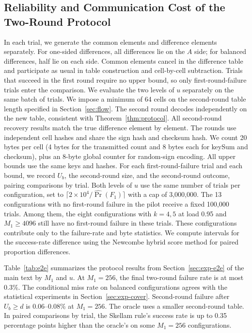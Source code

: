 \subsection{Reliability and Communication Cost of the Two-Round Protocol}\label{app:protocol}
In each trial, we generate the common elements and difference elements separately. For one-sided differences, all differences lie on the $A$ side; for balanced differences, half lie on each side. Common elements cancel in the difference table and participate as usual in table construction and cell-by-cell subtraction. Trials that succeed in the first round require no upper bound, so only first-round-failure trials enter the comparison. We evaluate the two levels of $u$ separately on the same batch of trials. We impose a minimum of 64 cells on the second-round table length specified in Section~\ref{sec:flow}. The second round decodes independently on the new table, consistent with Theorem~\ref{thm:protocol}. All second-round recovery results match the true difference element by element. The rounds use independent cell hashes and share the sign hash and checksum hash. We count 20 bytes per cell (4 bytes for the transmitted count and 8 bytes each for keySum and checksum), plus an 8-byte global counter for random-sign encoding. All upper bounds use the same keys and hashes. For each first-round-failure trial and each bound, we record $U_b$, the second-round size, and the second-round outcome, pairing comparisons by trial. Both levels of $u$ use the same number of trials per configuration, set to $\lceil2\times10^4/\widehat{\Pr}(F_1)\rceil$ with a cap of 3,000,000. The 13 configurations with no first-round failure in the pilot receive a fixed 100,000 trials. Among them, the eight configurations with $k=4,5$ at load 0.95 and $M_1\ge4096$ still have no first-round failure in these trials. These configurations contribute only to the failure-rate and byte statistics. We compute intervals for the success-rate difference using the Newcombe hybrid score method for paired proportion differences.

Table~\ref{tab:e2e} summarizes the protocol results from Section~\ref{sec:exp-e2e} of the main text by $M_1$ and $u$. At $M_1=256$, the final two-round failure rate is at most 0.3\%. The conditional miss rate on balanced configurations agrees with the statistical experiments in Section~\ref{sec:exp-cover}. Second-round failure after $U_b\ge d$ is 0.06--0.08\% at $M_1=256$. The oracle uses a smaller second-round table. In paired comparisons by trial, the Skellam rule's success rate is up to 0.35 percentage points higher than the oracle's on some $M_1=256$ configurations.

